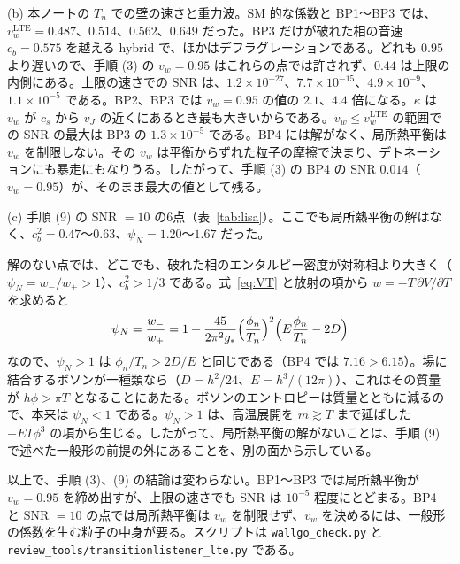 \documentclass[a4paper,10pt]{ltjsarticle}
\begin{document}
(b) 本ノートの $T_n$ での壁の速さと重力波。SM 的な係数と BP1〜BP3 では、$v_w^{\mathrm{LTE}}=0.487$、$0.514$、$0.562$、$0.649$ だった。BP3 だけが破れた相の音速 $c_b=0.575$ を越える hybrid で、ほかはデフラグレーションである。どれも $0.95$ より遅いので、手順 (3) の $v_w=0.95$ はこれらの点では許されず、$0.44$ は上限の内側にある。上限の速さでの SNR は、$1.2\times10^{-27}$、$7.7\times10^{-15}$、$4.9\times10^{-9}$、$1.1\times10^{-5}$ である。BP2、BP3 では $v_w=0.95$ の値の $2.1$、$4.4$ 倍になる。$\kappa$ は $v_w$ が $c_s$ から $v_J$ の近くにあるとき最も大きいからである。$v_w\le v_w^{\mathrm{LTE}}$ の範囲での SNR の最大は BP3 の $1.3\times10^{-5}$ である。BP4 には解がなく、局所熱平衡は $v_w$ を制限しない。その $v_w$ は平衡からずれた粒子の摩擦で決まり、デトネーションにも暴走にもなりうる。したがって、手順 (3) の BP4 の SNR $0.014$（$v_w=0.95$）が、そのまま最大の値として残る。

(c) 手順 (9) の SNR $=10$ の6点（表~\ref{tab:lisa}）。ここでも局所熱平衡の解はなく、$c_b^2=0.47$〜$0.63$、$\psi_N=1.20$〜$1.67$ だった。

解のない点では、どこでも、破れた相のエンタルピー密度が対称相より大きく（$\psi_N=w_-/w_+>1$）、$c_b^2>1/3$ である。式~\eqref{eq:VT} と放射の項から $w=-T\,\partial V/\partial T$ を求めると
\begin{equation}
\psi_N=\frac{w_-}{w_+}=1+\frac{45}{2\pi^2g_*}\Bigl(\frac{\phi_n}{T_n}\Bigr)^2\Bigl(E\frac{\phi_n}{T_n}-2D\Bigr)
\label{eq:psiN}
\end{equation}
なので、$\psi_N>1$ は $\phi_n/T_n>2D/E$ と同じである（BP4 では $7.16>6.15$）。場に結合するボソンが一種類なら（$D=h^2/24$、$E=h^3/(12\pi)$）、これはその質量が $h\phi>\pi T$ となることにあたる。ボソンのエントロピーは質量とともに減るので、本来は $\psi_N<1$ である。$\psi_N>1$ は、高温展開を $m\gtrsim T$ まで延ばした $-ET\phi^3$ の項から生じる。したがって、局所熱平衡の解がないことは、手順 (9) で述べた一般形の前提の外にあることを、別の面から示している。

以上で、手順 (3)、(9) の結論は変わらない。BP1〜BP3 では局所熱平衡が $v_w=0.95$ を締め出すが、上限の速さでも SNR は $10^{-5}$ 程度にとどまる。BP4 と SNR $=10$ の点では局所熱平衡は $v_w$ を制限せず、$v_w$ を決めるには、一般形の係数を生む粒子の中身が要る。スクリプトは \texttt{wallgo\_check.py} と \texttt{review\_tools/transitionlistener\_lte.py} である。
\end{document}
